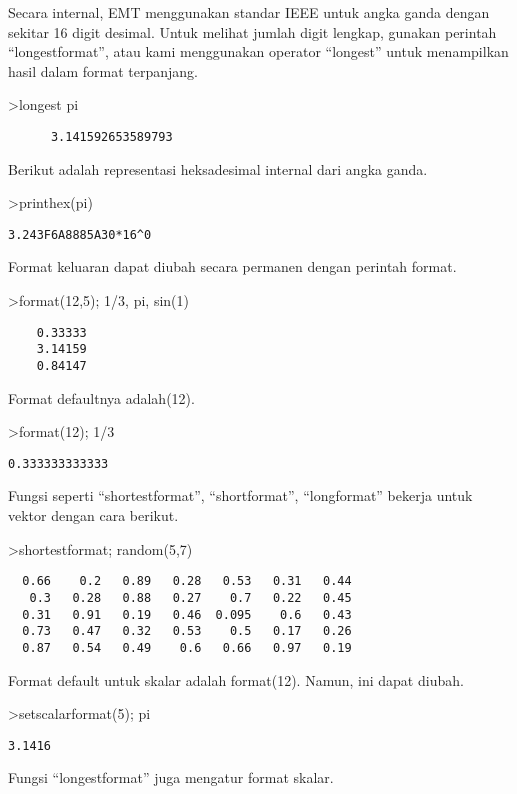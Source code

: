 \documentclass[
]{book}
\begin{document}
Secara internal, EMT menggunakan standar IEEE untuk angka ganda dengan sekitar 16 digit desimal. Untuk melihat jumlah digit lengkap, gunakan perintah ``longestformat'', atau kami menggunakan operator ``longest'' untuk menampilkan hasil dalam format terpanjang.

\textgreater longest pi

\begin{verbatim}
      3.141592653589793 
\end{verbatim}

Berikut adalah representasi heksadesimal internal dari angka ganda.

\textgreater printhex(pi)

\begin{verbatim}
3.243F6A8885A30*16^0
\end{verbatim}

Format keluaran dapat diubah secara permanen dengan perintah format.

\textgreater format(12,5); 1/3, pi, sin(1)

\begin{verbatim}
    0.33333 
    3.14159 
    0.84147 
\end{verbatim}

Format defaultnya adalah(12).

\textgreater format(12); 1/3

\begin{verbatim}
0.333333333333
\end{verbatim}

Fungsi seperti ``shortestformat'', ``shortformat'', ``longformat'' bekerja untuk vektor dengan cara berikut.

\textgreater shortestformat; random(5,7)

\begin{verbatim}
  0.66    0.2   0.89   0.28   0.53   0.31   0.44 
   0.3   0.28   0.88   0.27    0.7   0.22   0.45 
  0.31   0.91   0.19   0.46  0.095    0.6   0.43 
  0.73   0.47   0.32   0.53    0.5   0.17   0.26 
  0.87   0.54   0.49    0.6   0.66   0.97   0.19 
\end{verbatim}

Format default untuk skalar adalah format(12). Namun, ini dapat diubah.

\textgreater setscalarformat(5); pi

\begin{verbatim}
3.1416
\end{verbatim}

Fungsi ``longestformat'' juga mengatur format skalar.
\end{document}
